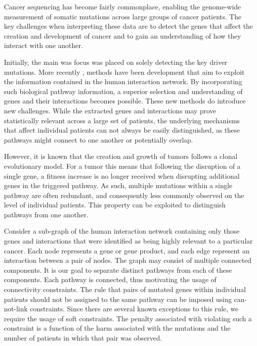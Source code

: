 \documentclass[conference,compsoc]{IEEEtran}
\begin{document}
Cancer sequencing has become fairly commonplace, enabling the genome-wide measurement of somatic mutations across large groups of cancer patients.
The key challenges when interpreting these data are to detect the genes that affect the creation and development of cancer and to gain an understanding of how they interact with one another.

Initially, the main was focus was placed on solely detecting the key driver mutations. More recently \cite{}, methods have been development that aim to exploit the information contained in the human interaction network. By incorporating such biological pathway information, a superior selection and understanding of genes and their interactions becomes possible. These new methods do introduce new challenges. While the extracted genes and interactions may prove statistically relevant across a large set of patients, the underlying mechanisms that affect individual patients can not always be easily distinguished, as these pathways might connect to one another or potentially overlap.

However, it is known that the creation and growth of tumors follows a clonal evolutionary model. For a tumor this means that following the disruption of a single gene, a fitness increase is no longer received when disrupting additional genes in the triggered pathway. As such, multiple mutations within a single pathway are often redundant, and consequently less commonly observed on the level of individual patients. This property can be exploited to distinguish pathways from one another.


Consider a sub-graph of the human interaction network containing only those genes and interactions that were identified as being highly relevant to a particular cancer. Each node represents a gene or gene product, and each edge represent an interaction between a pair of nodes. The graph may consist of multiple connected components. It is our goal to separate distinct pathways from each of these components. Each pathway is connected, thus motivating the usage of connectivity constraints. The rule that pairs of mutated genes within individual patients should not be assigned to the same pathway can be imposed using can-not-link constraints. Since there are several known exceptions to this rule, we require the usage of soft constraints. The penalty associated with violating such a constraint is a function of the harm associated with the mutations and the number of patients in which that pair was observed.

\end{document}
